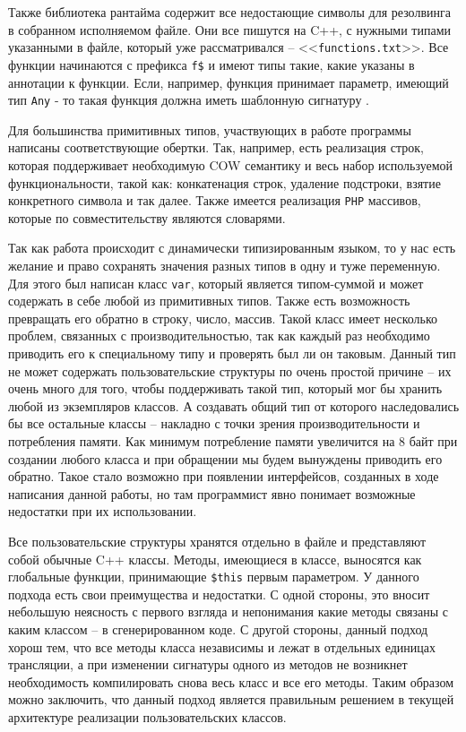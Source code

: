 Также библиотека рантайма содержит все недостающие символы для резолвинга в собранном исполняемом файле.
Они все пишутся на C++, с нужными типами указанными в файле, который уже рассматривался -- <<\verb|functions.txt|>>.
Все функции начинаются с префикса \verb|f$| и имеют типы такие, какие указаны в аннотации к функции.
Если, например, функция принимает параметр, имеющий тип \verb|Any| - то такая функция должна иметь шаблонную сигнатуру \cite[с.~665]{Stroustrup}.

Для большинства примитивных типов, участвующих в работе программы написаны соответствующие обертки.
Так, например, есть реализация строк, которая поддерживает необходимую COW \cite{COW} семантику и весь набор используемой функциональности, такой как: конкатенация строк, удаление подстроки, взятие конкретного символа и так далее.
Также имеется реализация \verb|PHP| массивов, которые по совместительству являются словарями.

Так как работа происходит с динамически типизированным языком, то у нас есть желание и право сохранять значения разных типов в одну и туже переменную.
Для этого был написан класс \verb|var|, который является типом-суммой и может содержать в себе любой из примитивных типов.
Также есть возможность превращать его обратно в строку, число, массив.
Такой класс имеет несколько проблем, связанных с производительностью, так как каждый раз необходимо приводить его к специальному типу и проверять был ли он таковым.
Данный тип не может содержать пользовательские структуры по очень простой причине -- их очень много для того, чтобы поддерживать такой тип, который мог бы хранить любой из экземпляров классов.
А создавать общий тип от которого наследовались бы все остальные классы -- накладно с точки зрения производительности и потребления памяти.
Как минимум потребление памяти увеличится на 8 байт при создании любого класса и при обращении мы будем вынуждены приводить его обратно.
Такое стало возможно при появлении интерфейсов, созданных в ходе написания данной работы, но там программист явно понимает возможные недостатки при их использовании.

Все пользовательские структуры хранятся отдельно в файле и представляют собой обычные C++ классы.
Методы, имеющиеся в классе, выносятся как глобальные функции, принимающие \verb|$this| первым параметром.
У данного подхода есть свои преимущества и недостатки.
С одной стороны, это вносит небольшую неясность с первого взгляда и непонимания какие методы связаны с каким классом -- в сгенерированном коде.
С другой стороны, данный подход хорош тем, что все методы класса независимы и лежат в отдельных единицах трансляции, а при изменении сигнатуры одного из методов не возникнет необходимость компилировать снова весь класс и все его методы.
Таким образом можно заключить, что данный подход является правильным решением в текущей архитектуре реализации пользовательских классов.

